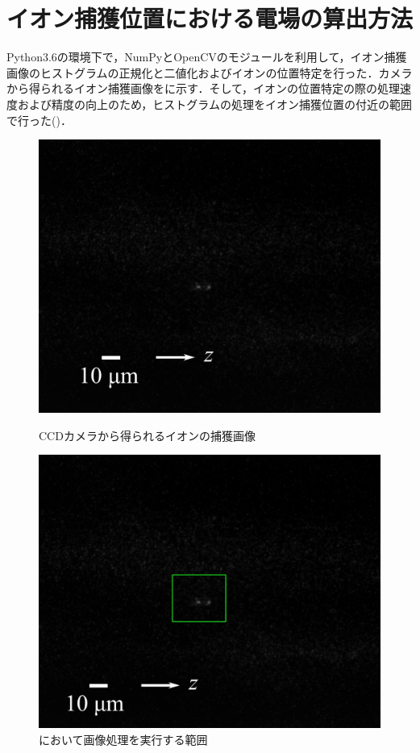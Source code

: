 {\clearpage

\section{イオン捕獲位置における電場の算出方法}

Python3.6の環境下で，NumPyとOpenCVのモジュールを利用して，イオン捕獲画像のヒストグラムの正規化と二値化およびイオンの位置特定を行った．カメラから得られるイオン捕獲画像をに示す．そして，イオンの位置特定の際の処理速度および精度の向上のため，ヒストグラムの処理をイオン捕獲位置の付近の範囲で行った()．

\begin{figure}[h]
	\begin{minipage}{0.48\linewidth}
		\begin{center}
			\includegraphics[width=0.6\columnwidth]{./methods/figure/raw_image.png}
			\caption{CCDカメラから得られるイオンの捕獲画像}
			\label{fig:raw_image}
		\end{center}
	\end{minipage}
	\begin{minipage}{0.48\linewidth}
		\begin{center}
			\includegraphics[width=0.6\columnwidth]{./methods/figure/rect_image.png}
			\caption{において画像処理を実行する範囲}
			\label{fig:rect_image}
		\end{center}
	\end{minipage}
\end{figure}

}
